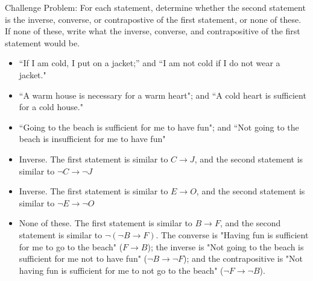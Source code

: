 \documentclass{article}
\theoremstyle{definition}
\begin{document}
	\noindent Challenge Problem:
	For each statement, determine whether the second statement is the inverse, converse, or contrapostive of the first statement, or none of these. If none of these, write what the inverse, converse, and contrapositive of the first statement would be.
	\begin{itemize}
		\item[(1)] ``If I am cold, I put on a jacket;'' and ``I am not cold if I do not wear a jacket."
		\item[(2)] ``A warm house is necessary for a warm heart"; and ``A cold heart is sufficient for a cold house."
		\item[(3)] ``Going to the beach is sufficient for me to have fun"; and ``Not going to the beach is insufficient for me to have fun"
	\end{itemize}
	\vspace{0.25cm}
	\begin{itemize}
		\item[(1)] Inverse. The first statement is similar to $ C \rightarrow J $, and the second statement is similar to $ \neg C \rightarrow \neg J$
		\item[(2)] Inverse. The first statement is similar to $ E \rightarrow O  $, and the second statement is similar to $ \neg E \rightarrow \neg O$
		\item[(3)] None of these. The first statement is similar to $ B \rightarrow F $, and the second statement is similar to $ \neg (\neg B \rightarrow F) $. The converse is "Having fun is sufficient for me to go to the beach" ($ F \rightarrow B $); the inverse is "Not going to the beach is sufficient for me not to have fun" ($ \neg B \rightarrow \neg F $); and the contrapositive is "Not having fun is sufficient for me to not go to the beach" ($ \neg F \rightarrow \neg B $).
	\end{itemize}
\end{document}
